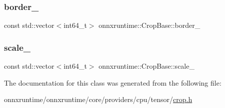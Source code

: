 \subsubsection{\texorpdfstring{border\+\_\+}{border\_}}
{\footnotesize\ttfamily const std\+::vector$<$int64\+\_\+t$>$ onnxruntime\+::\+Crop\+Base\+::border\+\_\+\hspace{0.3cm}{\ttfamily [protected]}}

\mbox{\label{classonnxruntime_1_1CropBase_a5605a9f5e6280eb96ea575a9db041763}} 
\subsubsection{\texorpdfstring{scale\+\_\+}{scale\_}}
{\footnotesize\ttfamily const std\+::vector$<$int64\+\_\+t$>$ onnxruntime\+::\+Crop\+Base\+::scale\+\_\+\hspace{0.3cm}{\ttfamily [protected]}}



The documentation for this class was generated from the following file\+:\begin{DoxyCompactItemize}
\item 
onnxruntime/onnxruntime/core/providers/cpu/tensor/\mbox{\hyperlink{cpu_2tensor_2crop_8h}{crop.\+h}}\end{DoxyCompactItemize}
